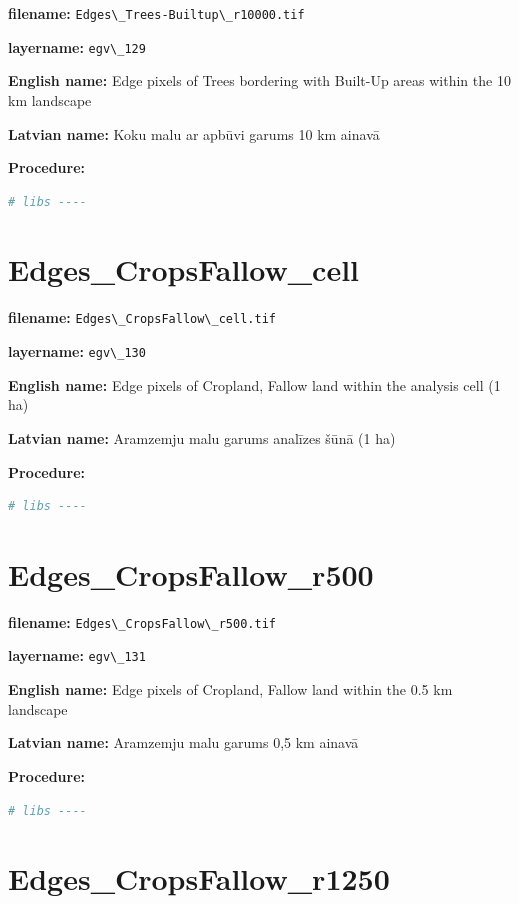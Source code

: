 \documentclass[
]{book}
\newcommand{\passthrough}[1]{#1}
\begin{document}
\textbf{filename:} \passthrough{\lstinline!Edges\_Trees-Builtup\_r10000.tif!}

\textbf{layername:} \passthrough{\lstinline!egv\_129!}

\textbf{English name:} Edge pixels of Trees bordering with Built-Up areas within the 10 km landscape

\textbf{Latvian name:} Koku malu ar apbūvi garums 10 km ainavā

\textbf{Procedure:}

\begin{lstlisting}[language=R]
# libs ----
\end{lstlisting}

\section{Edges\_CropsFallow\_cell}\label{ch06.130}

\textbf{filename:} \passthrough{\lstinline!Edges\_CropsFallow\_cell.tif!}

\textbf{layername:} \passthrough{\lstinline!egv\_130!}

\textbf{English name:} Edge pixels of Cropland, Fallow land within the analysis cell (1 ha)

\textbf{Latvian name:} Aramzemju malu garums analīzes šūnā (1 ha)

\textbf{Procedure:}

\begin{lstlisting}[language=R]
# libs ----
\end{lstlisting}

\section{Edges\_CropsFallow\_r500}\label{ch06.131}

\textbf{filename:} \passthrough{\lstinline!Edges\_CropsFallow\_r500.tif!}

\textbf{layername:} \passthrough{\lstinline!egv\_131!}

\textbf{English name:} Edge pixels of Cropland, Fallow land within the 0.5 km landscape

\textbf{Latvian name:} Aramzemju malu garums 0,5 km ainavā

\textbf{Procedure:}

\begin{lstlisting}[language=R]
# libs ----
\end{lstlisting}

\section{Edges\_CropsFallow\_r1250}\label{ch06.132}
\end{document}
